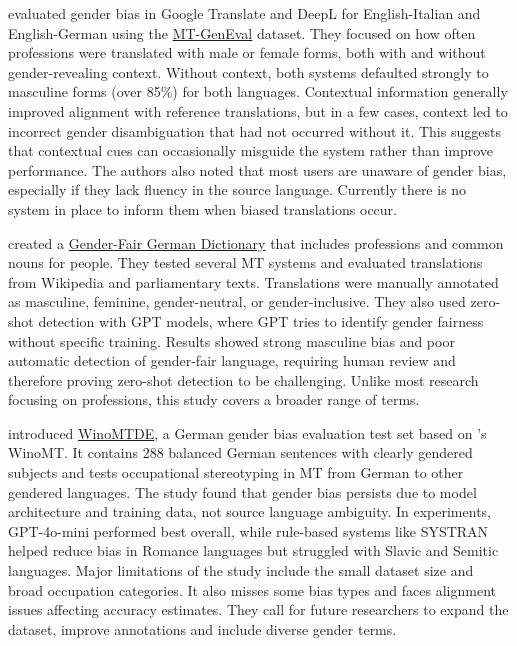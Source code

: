 \textbf{\citet{rescignoGenderBiasMachine2023}} evaluated gender bias in Google Translate and DeepL for English-Italian and English-German using the \href{https://github.com/amazon-science/machine-translation-gender-eval}{MT-GenEval} dataset. They focused on how often professions were translated with male or female forms, both with and without gender-revealing context. Without context, both systems defaulted strongly to masculine forms (over 85\%) for both languages. Contextual information generally improved alignment with reference translations, but in a few cases, context led to incorrect gender disambiguation that had not occurred without it. This suggests that contextual cues can occasionally misguide the system rather than improve performance. The authors also noted that most users are unaware of gender bias, especially if they lack fluency in the source language. Currently there is no system in place to inform them when biased translations occur.

\textbf{\citet{lardelliBuildingBridgesDataset2024}} created a \href{https://github.com/g8a9/building-bridges-gender-fair-german-mt}{Gender-Fair German Dictionary} that includes professions and common nouns for people. They tested several MT systems and evaluated translations from Wikipedia and parliamentary texts. Translations were manually annotated as masculine, feminine, gender-neutral, or gender-inclusive. They also used zero-shot detection with GPT models, where GPT tries to identify gender fairness without specific training. Results showed strong masculine bias and poor automatic detection of gender-fair language, requiring human review and therefore proving zero-shot detection to be challenging. Unlike most research focusing on professions, this study covers a broader range of terms.

\textbf{\citet{kapplAreAllSpanish2025}} introduced \href{https://github.com/michellekappl/mt_gender_german}{WinoMTDE}, a German gender bias evaluation test set based on \citealp{stanovskyEvaluatingGenderBias2019}'s WinoMT. It contains 288 balanced German sentences with clearly gendered subjects and tests occupational stereotyping in MT from German to other gendered languages. The study found that gender bias persists due to model architecture and training data, not source language ambiguity. In experiments, GPT-4o-mini performed best overall, while rule-based systems like SYSTRAN helped reduce bias in Romance languages but struggled with Slavic and Semitic languages. Major limitations of the study include the small dataset size and broad occupation categories. It also misses some bias types and faces alignment issues affecting accuracy estimates. They call for future researchers to expand the dataset, improve annotations and include diverse gender terms.


